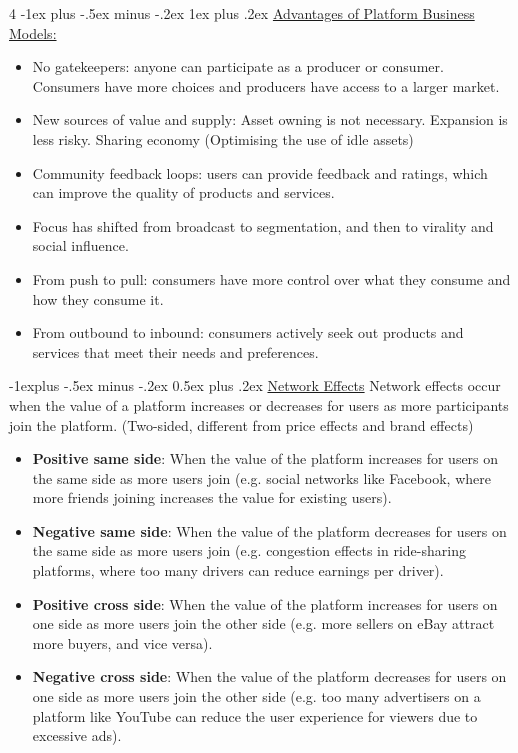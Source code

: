 \documentclass[10pt, landscape]{article}
\makeatletter
\renewcommand{\subsection}{\@startsection{subsection}{2}{0mm}%
  {-1explus -.5ex minus -.2ex}%
  {0.5ex plus .2ex}%
{\normalfont\normalsize\bfseries}}
\renewcommand{\subsubsection}{\@startsection{subsubsection}{3}{0mm}%
  {-1ex plus -.5ex minus -.2ex}%
  {1ex plus .2ex}%
{\normalfont\small\bfseries}}%
\makeatother
\begin{document}
\begin{multicols*}{4}
    \subsubsection{\underline{Advantages of Platform Business Models:}}
      \begin{itemize}
        \item No gatekeepers: anyone can participate as a producer or consumer. Consumers have more choices and producers have access to a larger market.
        \item New sources of value and supply: Asset owning is not necessary. Expansion is less risky. Sharing economy (Optimising the use of idle assets)
        \item Community feedback loops: users can provide feedback and ratings, which can improve the quality of products and services.
        \item Focus has shifted from broadcast to segmentation, and then to virality and social influence. 
        \item From push to pull: consumers have more control over what they consume and how they consume it.
        \item From outbound to inbound: consumers actively seek out products and services that meet their needs and preferences.
      \end{itemize}
      
    \subsection{\underline{Network Effects}}
    Network effects occur when the value of a platform increases or decreases for users as more participants join the platform. (Two-sided, different from price effects and brand effects)
    \begin{itemize}
      \item \textbf{Positive same side}: When the value of the platform increases for users on the same side as more users join (e.g. social networks like Facebook, where more friends joining increases the value for existing users).
      \item \textbf{Negative same side}: When the value of the platform decreases for users on the same side as more users join (e.g. congestion effects in ride-sharing platforms, where too many drivers can reduce earnings per driver).
      \item \textbf{Positive cross side}: When the value of the platform increases for users on one side as more users join the other side (e.g. more sellers on eBay attract more buyers, and vice versa).
      \item \textbf{Negative cross side}: When the value of the platform decreases for users on one side as more users join the other side (e.g. too many advertisers on a platform like YouTube can reduce the user experience for viewers due to excessive ads).
    \end{itemize}


\end{multicols*}
\end{document}
